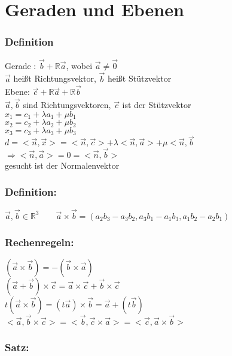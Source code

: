 \section{Geraden und Ebenen}
\subsubsection{Definition}
Gerade : $\vec{b} + \mathbb{R}\vec{a}$, wobei $\vec{a}\neq\vec{0}$\\
 $\vec{a}$ heißt Richtungsvektor, $\vec{b}$ heißt Stützvektor\\
Ebene: $\vec{c}+\mathbb{R}\vec{a}+\mathbb{R}\vec{b}$\\
$\vec{a}, \vec{b}$ sind Richtungsvektoren, $\vec{c}$ ist der Stützvektor\\
%
%
%
$x_{1}=c_{1}+\lambda a_{1}+\mu b_{1}$\\
$x_{2}=c_{2}+\lambda a_{2}+\mu b_{2}$\\
$x_{3}=c_{3}+\lambda a_{3}+\mu b_{3}$\\

$d=<\vec{n},\vec{x}>=<\vec{n},\vec{c}>+\lambda<\vec{n},\vec{a}>+\mu<\vec{n},\vec{b}$\\
$\Rightarrow <\vec{n},\vec{a}>=0=<\vec{n},\vec{b}>$\\
gesucht ist der Normalenvektor
%
%
%
\subsubsection{Definition:}
$\vec{a},\vec{b} \in \mathbb{R}^{3} \qquad \vec{a} \times \vec{b} = (a_{2}b_{3}-a_{3}b_{2},a_{3}b_{1}-a_{1}b_{3}, a_{1}b_{2}-a_{2}b_{1})$
%
%
%
\subsubsection{Rechenregeln:}
$(\vec{a}\times\vec{b})=-(\vec{b}\times\vec{a})$\\
$(\vec{a}+\vec{b})\times\vec{c}=\vec{a}\times\vec{c}+\vec{b}\times\vec{c}$\\
$t(\vec{a}\times\vec{b})=(t\vec{a})\times\vec{b}=\vec{a}+(t\vec{b})$\\
$<\vec{a},\vec{b}\times\vec{c}>=<\vec{b},\vec{c}\times\vec{a}>=<\vec{c},\vec{a}\times\vec{b}>$
%
%
%
\subsubsection{Satz:}